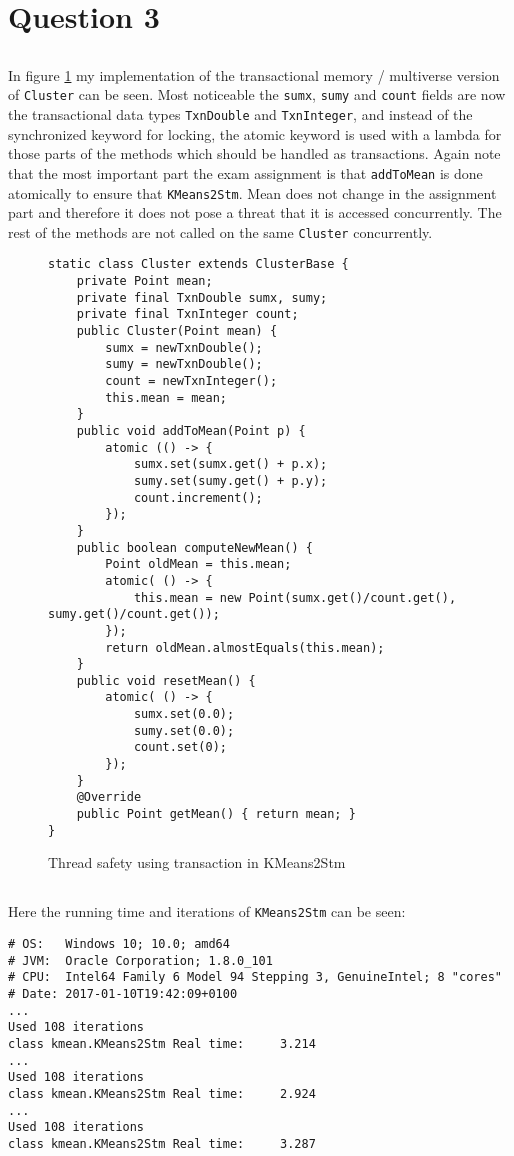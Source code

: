 \section{Question 3}
\subsection{}
In figure \ref{code:3:1} my implementation of the transactional memory / multiverse version of \texttt{Cluster} can be seen. Most noticeable the \texttt{sumx}, \texttt{sumy} and \texttt{count} fields are now the transactional data types \texttt{TxnDouble} and \texttt{TxnInteger}, and instead of the synchronized keyword for locking, the atomic keyword is used with a lambda for those parts of the methods which should be handled as transactions. Again note that the most important part the exam assignment is that \texttt{addToMean} is done atomically to ensure that \texttt{KMeans2Stm}. Mean does not change in the assignment part and therefore it does not pose a threat that it is accessed concurrently. The rest of the methods are not called on the same \texttt{Cluster} concurrently.

\begin{figure}
\begin{lstlisting}
static class Cluster extends ClusterBase {
    private Point mean;
    private final TxnDouble sumx, sumy;
    private final TxnInteger count;
    public Cluster(Point mean) {
        sumx = newTxnDouble();
        sumy = newTxnDouble();
        count = newTxnInteger();
        this.mean = mean;
    }
    public void addToMean(Point p) {
        atomic (() -> {
            sumx.set(sumx.get() + p.x);
            sumy.set(sumy.get() + p.y);
            count.increment();
        });
    }
    public boolean computeNewMean() {
        Point oldMean = this.mean;
        atomic( () -> {
            this.mean = new Point(sumx.get()/count.get(), sumy.get()/count.get());
        });
        return oldMean.almostEquals(this.mean);
    }
    public void resetMean() {
        atomic( () -> {
            sumx.set(0.0);
            sumy.set(0.0);
            count.set(0);
        });
    }
    @Override
    public Point getMean() { return mean; }
}
\end{lstlisting}
\caption{Thread safety using transaction in KMeans2Stm}
\label{code:3:1}
\end{figure}

\subsection{}
Here the running time and iterations of \texttt{KMeans2Stm} can be seen:
\begin{lstlisting}
# OS:   Windows 10; 10.0; amd64
# JVM:  Oracle Corporation; 1.8.0_101
# CPU:  Intel64 Family 6 Model 94 Stepping 3, GenuineIntel; 8 "cores"
# Date: 2017-01-10T19:42:09+0100
...
Used 108 iterations
class kmean.KMeans2Stm Real time:     3.214
...
Used 108 iterations
class kmean.KMeans2Stm Real time:     2.924
...
Used 108 iterations
class kmean.KMeans2Stm Real time:     3.287
\end{lstlisting}

